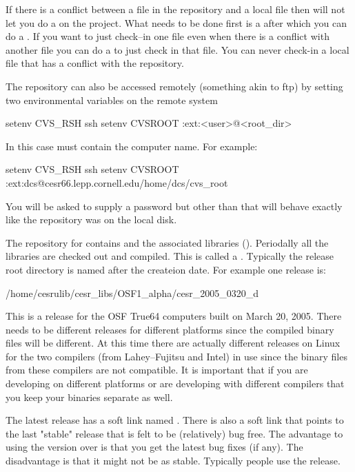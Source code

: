 If there is a conflict between a file in the repository and a local
file then \cvs will not let you do a  on the project. What
needs to be done first is a  after which you can do a
. If you want to just check--in one file even when there is
a conflict with another file you can do a  to just
check in that file. You can never check-in a local file that has a
conflict with the repository.

The repository can also be accessed remotely (something akin to ftp)
by setting two environmental variables on the remote system
\begin{example}
  setenv CVS_RSH ssh
  setenv CVSROOT :ext:<user>@<root_dir>
\end{example}
In this case  must contain the computer name. For example:
\begin{example}
  setenv CVS_RSH ssh
  setenv CVSROOT :ext:dcs@cesr66.lepp.cornell.edu/home/dcs/cvs_root
\end{example}
You will be asked to supply a password but other than that will
behave exactly like the repository was on the local disk.



The \cvs repository for \bmad contains \bmad and the associated
libraries (). Periodally all the libraries are checked
out and compiled. This is called a . Typically the release
root directory is named after the createion date. For example one release is:
\begin{example}
  /home/cesrulib/cesr_libs/OSF1_alpha/cesr_2005_0320_d
\end{example}
This is a release for the OSF True64 computers built on March 20,
2005. There needs to be different releases for different platforms
since the compiled binary files will be different. At this time there
are actually different releases on Linux for the two compilers (from
Lahey--Fujitsu and Intel) in use since the binary files from these
compilers are not compatible. It is important that if you are
developing on different platforms or are developing with different
compilers that you keep your binaries separate as well.

The latest release has a soft link named . There is
also a  soft link that
points to the last "stable" release that is felt to be (relatively)
bug free. The advantage to using the  version over
 is that you get the latest bug fixes (if any). The
disadvantage is that it might not be as stable. Typically people use
the  release.

